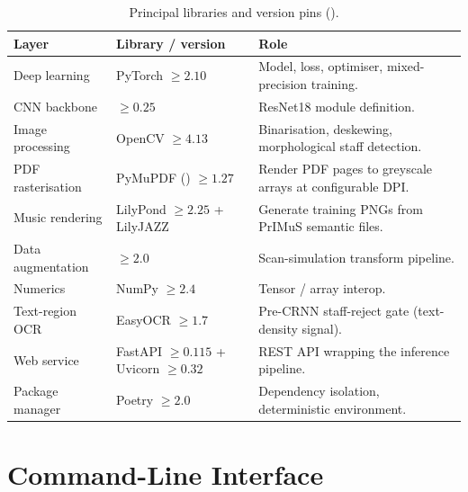 \begin{table}[H]
\centering
\small
\setlength{\tabcolsep}{5pt}
\renewcommand{\arraystretch}{1.35}
\begin{tabularx}{\textwidth}{@{} l l L @{}}
\toprule
\textbf{Layer} & \textbf{Library / version} & \textbf{Role} \\
\midrule
Deep learning            & PyTorch $\geq 2.10$~\cite{paszkeImperativeStyleHighPerformance2019} & Model, loss, optimiser, mixed-precision training. \\ \tfgrowsep
CNN backbone             &  $\geq 0.25$~\cite{torchvision2016} & ResNet18 module definition. \\ \tfgrowsep
Image processing         & OpenCV $\geq 4.13$~\cite{bradskiOpenCVLibrary2000} & Binarisation, deskewing, morphological staff detection. \\ \tfgrowsep
PDF rasterisation        & PyMuPDF () $\geq 1.27$~\cite{artifexPyMuPDF} & Render PDF pages to greyscale arrays at configurable DPI. \\ \tfgrowsep
Music rendering          & LilyPond $\geq 2.25$ + LilyJAZZ~\cite{nienhuysLilyPondSystem2003,hammerleOpenLilyPondFontsLilyJAZZ} & Generate training PNGs from PrIMuS semantic files. \\ \tfgrowsep
Data augmentation        &  $\geq 2.0$\,\cite{AlbumentationsFastFlexible} & Scan-simulation transform pipeline. \\ \tfgrowsep
Numerics                 & NumPy $\geq 2.4$~\cite{harrisArrayProgramming2020} & Tensor / array interop. \\ \tfgrowsep
Text-region OCR          & EasyOCR $\geq 1.7$~\cite{jaidedaiEasyOCR} & Pre-CRNN staff-reject gate (text-density signal). \\ \tfgrowsep
Web service              & FastAPI $\geq 0.115$ + Uvicorn $\geq 0.32$~\cite{ramirezFastAPI} & REST API wrapping the inference pipeline. \\ \tfgrowsep
Package manager          & Poetry $\geq 2.0$ & Dependency isolation, deterministic environment. \\
\bottomrule
\end{tabularx}
\caption{Principal libraries and version pins ().}
\label{tab:tech-stack}
\end{table}

\section{Command-Line Interface}

